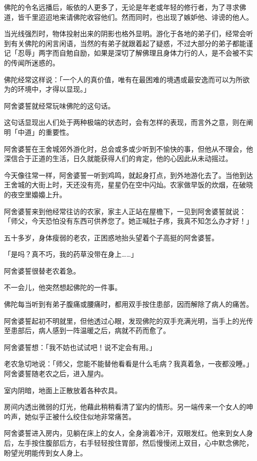 \documentclass[12pt,twoside,openany]{book}
\begin{document}
佛陀的令名远播后，皈依的人更多了，无论是年老或年轻的修行者，为了寻求佛道，皆千里迢迢地来请佛陀收容他们。然而同时，也出现了嫉妒他、诽谤的他人。

当光线强烈时，物体投射出来的阴影也格外显明。游化于各地的弟子们，经常会听到有关佛陀的闲言闲语，当然的有弟子就跟着起了疑惑，不过大部分的弟子都能谨记「忍辱」两字而自勉自励，如果是深切了解佛理且身体力行的人，是不会被不实的传闻所迷惑的。

佛陀经常这样说：「一个人的真价值，唯有在最困难的境遇或最安逸而可以为所欲为的环境中，才得以显现。」

阿舍婆誓就经常玩味佛陀的这句话。

这句话显现出人们处于两种极端的状态时，会有怎样的表现，而言外之意，则在阐明「中道」的重要性。

阿舍婆誓在王舍城郊外游化时，总会或多或少听到不愉快的事，但他从不理会，他深信合于正道的生活，日久就能获得人们的肯定，他的心因此从未动摇过。

今天像往常一样，阿舍婆誓一听到鸡鸣，就起身打点，到外地游化去了。当他到达王舍城的大街上时，天还没有亮，星星仍在空中闪灿。农家做早饭的炊烟，在破晓的夜空里嬝嬝上升。

阿舍婆誓来到他经常往访的农家，家主人正站在屋檐下，一见到阿舍婆誓就说：「师父，今天恐怕没有东西可供养您了。她正喊肚子疼，我真不知怎么办才好！」

五十多岁，身体瘦弱的老农，正困惑地抬头望着个子高挺的阿舍婆誓。

「是吗？真不巧，我的药草没带在身上……」

阿舍婆誓很替老农着急。

不一会儿，他突然想起佛陀的一件事。

佛陀每当听到有弟子腹痛或腰痛时，都用双手按住患部，因而解除了病人的痛苦。

阿舍婆誓起初不明就里，但他透过心眼，发现佛陀的双手充满光明，当手上的光传至患部后，病人感到一阵温暖之后，病就不药而愈了。

阿舍婆誓想：「我不妨也试试吧！说不定会有用。」

老农急切地说：「师父，您能不能替他看看是什么毛病？我真着急，一夜都没睡。」阿舍婆誓随老农之后，进入屋内。

室内阴暗，地面上正散放着各种农具。

房间内透出微弱的灯光，他藉此稍稍看清了室内的情形。另一端传来一个女人的呻吟声，她似乎正被什么绞住似地非常痛苦。

阿舍婆誓进入房内，见躺在床上的女人，全身淌着冷汗，双眼发红。他来到女人身后，左手按住腹部后方，右手轻轻按住胃部，然后慢慢闭上双目，心中默念佛陀，盼望光明能传到女人身上。
\end{document}
